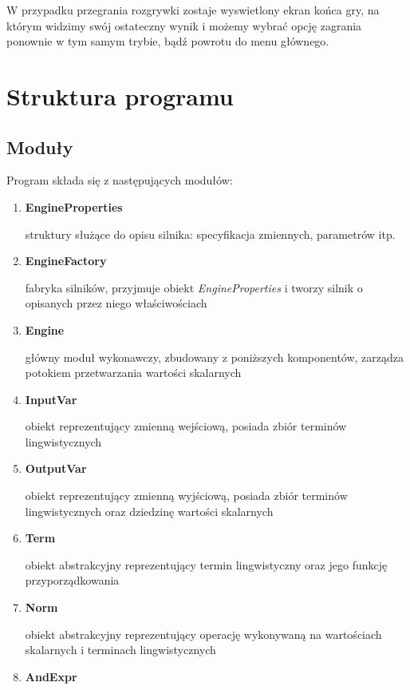 \documentclass{article}
\begin{document}
W przypadku przegrania rozgrywki zostaje wyswietlony ekran końca gry, na którym widzimy swój
ostateczny wynik i możemy wybrać opcję zagrania ponownie w tym samym trybie, bądź powrotu
do menu głównego.

\section {Struktura programu}

\subsection {Moduły}

Program składa się z następujących modułów:

\begin{enumerate}
\item \textbf{EngineProperties}

  struktury służące do opisu silnika: specyfikacja zmiennych, parametrów itp.

\item \textbf{EngineFactory}

  fabryka silników, przyjmuje obiekt \emph{EngineProperties} i tworzy silnik o
  opisanych przez niego właściwościach

\item \textbf{Engine}

  główny moduł wykonawczy, zbudowany z poniższych komponentów, zarządza potokiem
  przetwarzania wartości skalarnych

\item \textbf{InputVar}

  obiekt reprezentujący zmienną wejściową, posiada zbiór terminów
  lingwistycznych

\item \textbf{OutputVar}

  obiekt reprezentujący zmienną wyjściową, posiada zbiór terminów
  lingwistycznych oraz dziedzinę wartości skalarnych

\item \textbf{Term}

  obiekt abstrakcyjny reprezentujący termin lingwistyczny oraz jego
  funkcję przyporządkowania

\item \textbf{Norm}

  obiekt abstrakcyjny reprezentujący operację wykonywaną na wartościach
  skalarnych i terminach lingwistycznych

\item \textbf{AndExpr}


\end{enumerate}
\end{document}
